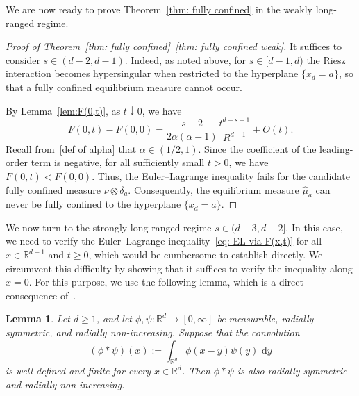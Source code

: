 \documentclass{amsart}
\def\R{\mathbb{R}}
\newcommand{\ud}{\, \mathrm{d}}
\theoremstyle{plain}
\newtheorem{lem}[thm]{Lemma}
\theoremstyle{remark}
\numberwithin{equation}{section}
\begin{document}
We are now ready to prove Theorem~\ref{thm: fully confined} in the
weakly long-ranged regime.

\begin{proof}[Proof of Theorem~\ref{thm: fully confined}~\ref{thm: fully confined weak}]
 It suffices to consider $s\in(d-2,d-1)$. Indeed, as noted above, for
$s\in[d-1,d)$ the Riesz interaction becomes hypersingular when restricted
to the hyperplane $\{x_d=a\}$, so that a fully confined equilibrium
measure cannot occur.

By Lemma~\ref{lem:F(0,t)}, as $t\downarrow 0$, we have 
    \begin{equation}
        F(0,t)-F(0,0) = \frac{s+2}{2\alpha (\alpha-1)}\frac{t^{d-s-1}}{R^{d-1}} + O(t). 
    \end{equation} 
Recall from~\eqref{def of alpha} that $\alpha\in(1/2,1)$. Since the coefficient of the leading-order term is negative, for all sufficiently small $t>0$, we have $F(0,t)<F(0,0)$. Thus, the Euler--Lagrange inequality fails for the candidate fully confined measure $\nu\otimes\delta_a$.
Consequently, the equilibrium measure $\widehat{\mu}_a$ can never be
fully confined to the hyperplane $\{x_d=a\}$.
\end{proof}


 

We now turn to the strongly long-ranged regime $s\in(d-3,d-2]$.
In this case, we need to verify the Euler--Lagrange inequality~\eqref{eq: EL via F(x,t)} for all $\hat{x}\in\R^{d-1}$ and $t\ge0$, which would be cumbersome to establish directly. We circumvent this difficulty by showing that it suffices to verify the inequality along $\hat{x}=0$. For this purpose, we use the following lemma, which is a direct consequence of~\cite[Lemma~2.2 (i)]{Li83}. 

\begin{lem}\label{lem:convolution}
Let $d\ge1$, and let $\phi,\psi:\R^d\to[0,\infty]$ be measurable,
radially symmetric, and radially non-increasing. Suppose that the
convolution
\begin{equation}
  (\phi*\psi)(x)
    :=
    \int_{\R^d}\phi(x-y)\psi(y)\,\ud y
\end{equation} 
is well defined and finite for every $x\in\R^d$. Then $\phi*\psi$ is
also radially symmetric and radially non-increasing.
\end{lem}
\end{document}
